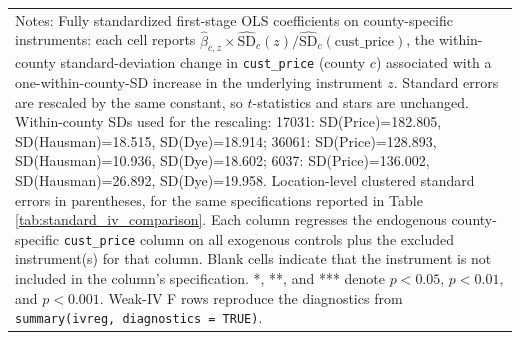 \begin{table}[!htbp]
\begin{tabular}{lcccc}
\multicolumn{5}{p{0.92\linewidth}}{\footnotesize Notes: Fully standardized first-stage OLS coefficients on county-specific instruments: each cell reports $\widehat{\beta}_{c,z}\times\widehat{\mathrm{SD}}_c(z)/\widehat{\mathrm{SD}}_c(\text{cust\_price})$, the within-county standard-deviation change in \texttt{cust\_price} (county $c$) associated with a one-within-county-SD increase in the underlying instrument $z$. Standard errors are rescaled by the same constant, so $t$-statistics and stars are unchanged. Within-county SDs used for the rescaling: 17031: SD(Price)=182.805, SD(Hausman)=18.515, SD(Dye)=18.914; 36061: SD(Price)=128.893, SD(Hausman)=10.936, SD(Dye)=18.602; 6037: SD(Price)=136.002, SD(Hausman)=26.892, SD(Dye)=19.958. Location-level clustered standard errors in parentheses, for the same specifications reported in Table \ref{tab:standard_iv_comparison}. Each column regresses the endogenous county-specific \texttt{cust\_price} column on all exogenous controls plus the excluded instrument(s) for that column. Blank cells indicate that the instrument is not included in the column's specification. *, **, and *** denote $p<0.05$, $p<0.01$, and $p<0.001$. Weak-IV F rows reproduce the diagnostics from \texttt{summary(ivreg, diagnostics = TRUE)}.}\\
\end{tabular}
\end{table}
